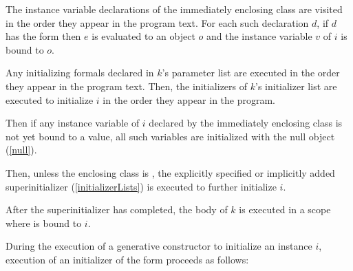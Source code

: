 \documentclass{article}
\begin{document}
\LMHash{}
The instance variable declarations of the immediately enclosing class are visited in the order they appear in the program text.
For each such declaration $d$, if $d$ has the form 
then $e$ is evaluated to an object $o$
and the instance variable $v$ of $i$ is bound to $o$.

\LMHash{}
Any initializing formals declared in $k$'s parameter list are executed in the order they appear in the program text.
Then, the initializers of $k$'s initializer list are executed to initialize $i$
in the order they appear in the program.


\LMHash{}
Then if any instance variable of $i$ declared by the immediately enclosing class
is not yet bound to a value,
all such variables are initialized with the null object (\ref{null}).

\LMHash{}
Then, unless the enclosing class is , the explicitly specified or
implicitly added superinitializer (\ref{initializerLists}) is executed to
further initialize $i$.


\LMHash{}
After the superinitializer has completed, the body of $k$ is executed in a scope where \THIS{} is bound to $i$.


\LMHash{}
During the execution of a generative constructor to initialize an instance $i$,
execution of an initializer of the form 
proceeds as follows:
\end{document}
